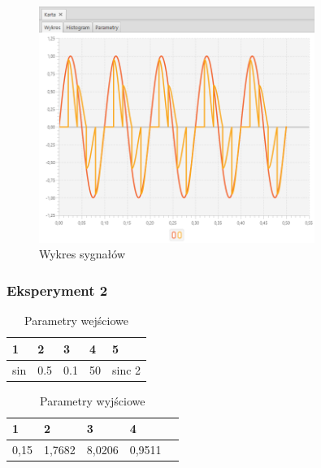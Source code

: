 \documentclass[12pt]{article}
\begin{document}
{{{                \begin{figure}[H]
                    \centering
                    \includegraphics[width=0.8\textwidth]{img/result/experiment4/01/data_draw_original_chart_recon_output_130545.png}
                    \caption{Wykres sygnałów}
                \end{figure}
            }
            \newpage

            \subsubsection{Eksperyment 2} {
                \begin{table}[H]
                    \centering
                    \begin{tabular}{|l|l|l|l|l|}
                        \hline
                        1 & 2 & 3 & 4 & 5   \\ \hline
                        sin & 0.5 & 0.1 & 50 & sinc 2  \\ \hline
                    \end{tabular}
                    \caption{Parametry wejściowe}
                \end{table}

                \begin{table}[H]
                    \centering
                    \begin{tabular}{|l|l|l|l|l|}
                        \hline
                        1 & 2 & 3 & 4   \\ \hline
                        0,15 & 1,7682 & 8,0206 & 0,9511 \\ \hline
                    \end{tabular}
                    \caption{Parametry wyjściowe}
                \end{table}


}}}
\end{document}
